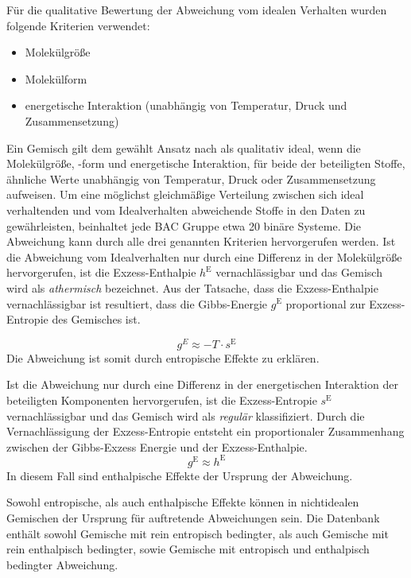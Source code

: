 \documentclass[../thesis.tex]{subfiles}
\begin{document}
Für die qualitative Bewertung der Abweichung vom idealen Verhalten wurden folgende Kriterien verwendet:
\begin{itemize}
	\item Molekülgröße
	\item Molekülform
	\item energetische Interaktion (unabhängig von Temperatur, Druck und Zusammensetzung)
\end{itemize}
Ein Gemisch gilt dem gewählt Ansatz nach als qualitativ ideal, wenn die Molekülgröße, -form und energetische Interaktion, für beide der beteiligten Stoffe, ähnliche Werte unabhängig von Temperatur, Druck oder Zusammensetzung aufweisen.
Um eine möglichst gleichmäßige Verteilung zwischen sich ideal verhaltenden und vom Idealverhalten abweichende Stoffe in den Daten zu gewährleisten, beinhaltet jede BAC Gruppe etwa 20 binäre Systeme.
Die Abweichung kann durch alle drei genannten Kriterien hervorgerufen werden. Ist die Abweichung vom Idealverhalten nur durch eine Differenz in der Molekülgröße hervorgerufen, ist die Exzess-Enthalpie $h^{\mathrm{E}}$ vernachlässigbar und das Gemisch wird als \textit{athermisch} bezeichnet. Aus der Tatsache, dass die Exzess-Enthalpie vernachlässigbar ist resultiert, dass die Gibbs-Energie $g^{\mathrm{E}}$ proportional zur Exzess-Entropie des Gemisches ist.

\begin{equation}
	g^E \approx - T \cdot s^{\mathrm{E}}
\end{equation}   
Die Abweichung ist somit durch entropische Effekte zu erklären.

Ist die Abweichung nur durch eine Differenz in der energetischen Interaktion der beteiligten Komponenten hervorgerufen, ist die Exzess-Entropie $s^{\mathrm{E}}$ vernachlässigbar und das Gemisch wird als \textit{regulär} klassifiziert. Durch die Vernachlässigung der Exzess-Entropie entsteht ein proportionaler Zusammenhang zwischen der Gibbs-Exzess Energie und der Exzess-Enthalpie.
\begin{equation}
	g^{\mathrm{E}} \approx h^{\mathrm{E}}
\end{equation}
In diesem Fall sind enthalpische Effekte der Ursprung der Abweichung.

Sowohl entropische, als auch enthalpische Effekte können in nichtidealen Gemischen der Ursprung für auftretende Abweichungen sein. Die Datenbank enthält sowohl Gemische mit rein entropisch bedingter, als auch Gemische mit rein enthalpisch bedingter, sowie Gemische mit entropisch und enthalpisch bedingter Abweichung.
\end{document}
